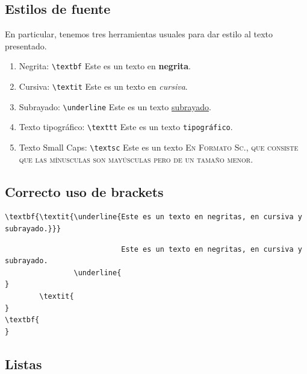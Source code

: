 \documentclass[../notes.tex]{subfiles}
\begin{document}
    \subsection{Estilos de fuente}
        En particular, tenemos tres herramientas usuales para dar estilo al texto presentado.
            \begin{enumerate}
                \item Negrita: \texttt{\textbackslash textbf} Este es un texto en \textbf{negrita}.
                    
                \item Cursiva: \texttt{\textbackslash textit} Este es un texto en \textit{cursiva}.
                \item Subrayado: \texttt{\textbackslash underline} Este es un texto \underline{subrayado}.
                \item Texto tipográfico: \texttt{\textbackslash texttt} Este es un texto \texttt{tipográfico}.
                \item Texto Small Caps: \texttt{\textbackslash textsc} Este es un texto \textsc{En Formato Sc., que consiste que las mínusculas son mayúsculas pero de un tamaño menor}.
            \end{enumerate}

    \subsection{Correcto uso de brackets}
        \begin{verbatim}
\textbf{\textit{\underline{Este es un texto en negritas, en cursiva y subrayado.}}}
        \end{verbatim}
        
        \begin{verbatim}
                           Este es un texto en negritas, en cursiva y subrayado.
                \underline{                                                     }
        \textit{                                                                 }
\textbf{                                                                          }
        \end{verbatim}

    
    \subsection{Listas}
    
\end{document}
